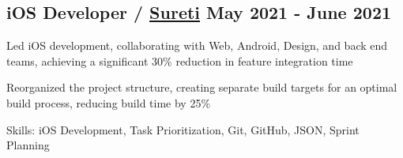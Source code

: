 \subsection{{iOS Developer / \href{https://sureti.com/}{Sureti} \hfill May 2021 - June 2021}}
\begin{zitemize}
\setlength\itemsep{0.5em}

\item Led iOS development, collaborating with Web, Android, Design, and back end teams, achieving a significant 30\% reduction in feature integration time

\item Reorganized the project structure, creating separate build targets for an optimal build process, reducing build time by 25\%

\item[] Skills: iOS Development, Task Prioritization, Git, GitHub, JSON, Sprint Planning

\end{zitemize}
